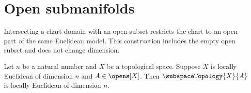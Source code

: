 \section{Open submanifolds}





Intersecting a chart domain with an open subset restricts the chart to an
open part of the same Euclidean model. This construction includes the empty
open subset and does not change dimension.

\begin{theorem}\label{open_subspace_is_locally_euclidean}
    Let $n$ be a natural number and $X$ be a topological space.
    Suppose $X$ is locally Euclidean of dimension $n$ and $A\in\opens[X]$.
    Then $\subspaceTopology{X}{A}$ is locally Euclidean of dimension $n$.
\end{theorem}
